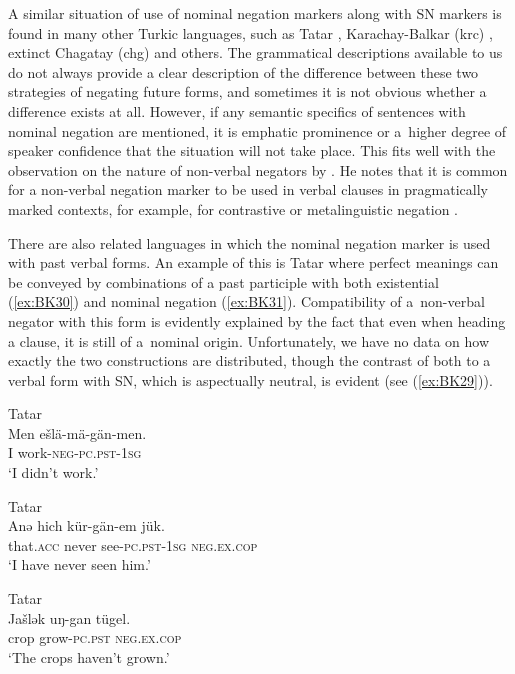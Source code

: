 \documentclass[output=paper]{langsci/langscibook}
\begin{document}
A similar situation of use of nominal negation markers along with SN markers is found in many other Turkic languages, such as Tatar \citep{poppe1961a}, Karachay-Balkar (krc) \citep{seegmiller1996a}, extinct Chagatay (chg) \citep{bodrogligeti2001a} and others. The grammatical descriptions available to us do not always provide a clear description of the difference between these two strategies of negating future forms, and sometimes it is not obvious whether a difference exists at all. However, if any semantic specifics of sentences with nominal negation are mentioned, it is emphatic prominence or a higher degree of speaker confidence that the situation will not take place. This fits well with the observation on the nature of non-verbal negators by \citet{Horn1989}. He notes that it is common for a non-verbal negation marker to be used in verbal clauses in pragmatically marked contexts, for example, for contrastive or metalinguistic negation \citep[446, 451–452]{Horn1989}.

There are also related languages in which the nominal negation marker is used with past verbal forms. An example of this is Tatar where perfect meanings can be conveyed by combinations of a past participle with both existential (\ref{ex:BK30}) and nominal negation (\ref{ex:BK31}). Compatibility of a non-verbal negator with this form is evidently explained by the fact that even when heading a clause, it is still of a nominal origin. Unfortunately, we have no data on how exactly the two constructions are distributed, though the contrast of both to a verbal form with SN, which is aspectually neutral, is evident (see (\ref{ex:BK29})).

\ea Tatar \citep[69]{poppe1961a} \label{ex:BK29}\\
	\gll Men	ešlä-mä-gän-men.\\
	I	work-\textsc{neg-pc.pst-1sg}\\
	\glt `I didn’t work.'
\z

\ea Tatar \citep[126]{poppe1961a} \label{ex:BK30}\\
	\gll Anǝ		hich		kür-gän-em			jük.\\
	that.\textsc{acc}	never		see-\textsc{pc.pst-1sg}	\textsc{neg.ex.cop}\\
	\glt `I have never seen him.'
\z

\ea Tatar \citep[126]{poppe1961a} \label{ex:BK31}\\
	\gll Jašlǝk		uŋ-gan			tügel.\\
	crop		grow-\textsc{pc.pst}	\textsc{neg.ex.cop}\\
	\glt `The crops haven’t grown.'
\z
\end{document}
